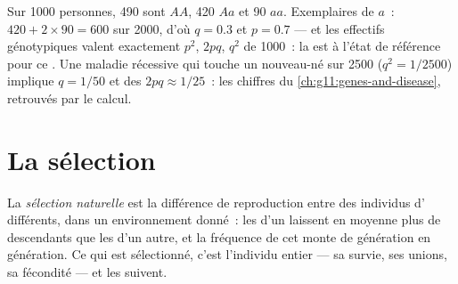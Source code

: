 \begin{example}\label{ex:g12:selection-drift-speciation:count}
Sur 1000 personnes, 490 sont $AA$, 420 $Aa$ et 90 $aa$. Exemplaires de
$a$~: $420 + 2 \times 90 = 600$ sur 2000, d'où $q = 0.3$ et $p = 0.7$
--- et les effectifs génotypiques valent exactement $p^2$, $2pq$, $q^2$
de 1000~: la  est à l'état de référence pour ce . Une
maladie récessive qui touche un nouveau-né sur 2500 ($q^2 = 1/2500$)
implique $q = 1/50$ et des  $2pq \approx 1/25$~: les chiffres
du \cref{ch:g11:genes-and-disease}, retrouvés par le calcul.
\end{example}

\section{La sélection}

\begin{definition}\label{def:g12:selection-drift-speciation:selection}
La \emph{sélection naturelle} est la
différence de reproduction entre des individus  d'
différents, dans un environnement donné~: les  d'un 
laissent en moyenne plus de descendants que les  d'un autre, et
la fréquence de cet  monte de génération en génération. Ce qui
est sélectionné, c'est l'individu entier --- sa survie, ses unions, sa
fécondité --- et les  suivent.
\end{definition}

